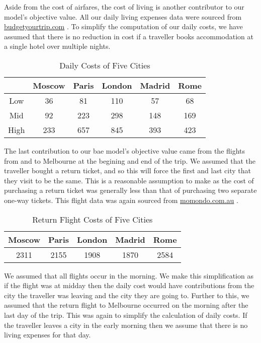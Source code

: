 \documentclass[12pt]{article}
\begin{document}
Aside from the cost of airfares, the cost of living is another contributor to our model's objective value. All our daily living expenses data were sourced from \url{budgetyourtrip.com} \cite{budget}. To simplify the computation of our daily costs, we have assumed that there is no reduction in cost if a traveller books accommodation at a single hotel over multiple nights.

\begin{table}[h]
\caption{Daily Costs of Five Cities}
\centering
\vspace{1mm}
\begin{tabular}{c|c|c|c|c|c}
\hline
\rule{0pt}{2ex}  & Moscow & Paris & London & Madrid & Rome \\
\hline
\rule{0pt}{2ex}Low & 36 & 81 & 110 & 57 & 68 \\
Mid & 92 & 223 & 298 & 148 & 169 \\
High & 233 & 657 & 845 & 393 & 423 \\

\end{tabular}
\end{table}

The last contribution to our bae model's objective value came from the flights from and to Melbourne at the begining and end of the trip. We assumed that the traveller bought a return ticket, and so this will force the first and last city that they visit to be the same. This is a reasonable assumption to make as the cost of purchasing a return ticket was generally less than that of purchasing two separate one-way tickets.  This flight data was again sourced from \url{momondo.com.au} \cite{momondo}.

\begin{table}[h]
\caption{Return Flight Costs of Five Cities}
\centering
\vspace{1mm}
\begin{tabular}{c|c|c|c|c}
\hline
\rule{0pt}{2ex} Moscow & Paris & London & Madrid & Rome \\
\hline
\rule{0pt}{2ex} 2311 & 2155 & 1908 & 1870 & 2584 \\

\end{tabular}
\end{table}

We assumed that all flights occur in the morning. We make this simplification as if the flight was at midday then the daily cost would have contributions from the city the traveller was leaving and the city they are going to. Further to this, we assumed that the return flight to Melbourne occurred on the morning after the last day of the trip. This was again to simplify the calculation of daily costs. If the traveller leaves a city in the early morning then we assume that there is no living expenses for that day.
\end{document}
